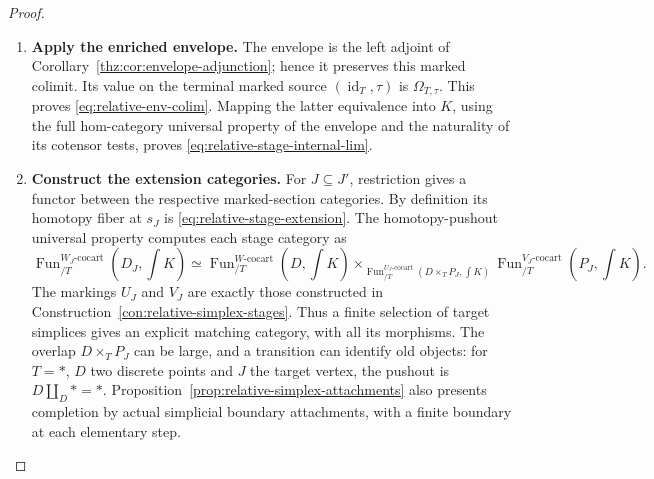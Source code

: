 \documentclass[oneside]{article}
\theoremstyle{plain}
\theoremstyle{definition}
\theoremstyle{remark}
\newcommand{\Fun}{\operatorname{Fun}}
\newcommand{\coc}{\mathrm{cocart}}
\newcommand{\id}{\operatorname{id}}
\begin{document}
\begin{proof}
\begin{enumerate}
Thus the marked simplicial resolution,
Lemma~\ref{thz:lem:marked-resolution}, gives
\[
 \operatorname*{colim}_{J\in\mathcal F_Q}P_J
 \simeq (T,\tau).
\]
By Lemma~\ref{lem:filtered-marked-exactness},
$\operatorname*{colim}_J(D\times_TP_J)\simeq D\times_TT\simeq D$.
As a colimit functor preserves pushouts, the definition of $D_J$
then yields
\begin{align*}
 \operatorname*{colim}_JD_J
 &\simeq
 \left(\operatorname*{colim}_JD\right)
 \amalg_{\operatorname*{colim}_J(D\times_TP_J)}
        \operatorname*{colim}_JP_J\\
 &\simeq D\amalg_DT\simeq T.
\end{align*}
All these equivalences lie in the marked slice over $T$, proving
\eqref{eq:relative-stage-colim}.
\item \textbf{Apply the enriched envelope.}
The envelope is the left adjoint of
Corollary~\ref{thz:cor:envelope-adjunction}; hence it preserves this
marked colimit. Its value on the terminal marked source
$(\id_T,\tau)$ is $\Omega_{T,\tau}$. This proves
\eqref{eq:relative-env-colim}. Mapping the latter equivalence into
$K$, using the full hom-category universal property of the envelope
and the naturality of its cotensor tests, proves
\eqref{eq:relative-stage-internal-lim}.
\item \textbf{Construct the extension categories.}
For $J\subseteq J'$, restriction gives a functor between the
respective marked-section categories. By definition its homotopy
fiber at $s_J$ is \eqref{eq:relative-stage-extension}. The
homotopy-pushout universal property computes each stage category as
\[
 \Fun^{W_J\text{-}\coc}_{/T}(D_J,\textstyle\int K)
 \simeq
 \Fun^{W\text{-}\coc}_{/T}(D,\textstyle\int K)
 \times_{\Fun^{U_J\text{-}\coc}_{/T}(D\times_TP_J,\int K)}
 \Fun^{V_J\text{-}\coc}_{/T}(P_J,\textstyle\int K).
\]
The markings $U_J$ and $V_J$ are exactly those constructed in
Construction~\ref{con:relative-simplex-stages}. Thus a finite selection of target simplices
gives an explicit matching category, with all its morphisms.
The overlap $D\times_TP_J$ can be large, and a transition can identify
old objects: for $T=*$, $D$ two discrete points and $J$ the target
vertex, the pushout is $D\amalg_D *=*$. Proposition~\ref{prop:relative-simplex-attachments}
also presents completion by actual simplicial boundary attachments,
with a finite boundary at each elementary step.\qedhere
\end{enumerate}
\end{proof}
\end{document}
